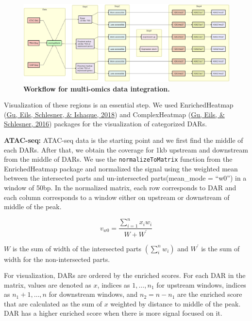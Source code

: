 \documentclass[12pt,twoside]{reedthesis}
\begin{document}
\newpage
\begin{landscape}


\begin{figure}[htbp]

{\centering \includegraphics{thesis_files/figure-latex/mf8-1} 

}

\caption[Workflow for multi-omics data integration]{\textbf{Workflow for multi-omics data integration.}}\label{fig:mf8}
\end{figure}
\end{landscape}
Visualization of these regions is an essential step. We used
EnrichedHeatmap (\protect\hyperlink{ref-gu2018}{Gu, Eils, Schlesner, \& Ishaque, 2018}) and ComplexHeatmap (\protect\hyperlink{ref-gu2016}{Gu, Eils, \& Schlesner, 2016}) packages for the
visualization of categorized DARs.

\textbf{ATAC-seq:} ATAC-seq data is the starting point and we first find the
middle of each DARs. After that, we obtain the coverage for 1kb upstream
and downstream from the middle of DARs. We use the \texttt{normalizeToMatrix}
function from the EnrichedHeatmap package and normalized the signal
using the weighted mean between the intersected parts and un-intersected
parts(mean\_mode = ``w0'') in a window of 50bp. In the normalized matrix,
each row corresponds to DAR and each column corresponds to a window
either on upstream or downstream of middle of the peak.

\[
v_{w 0}=\frac{\sum_{i=1}^{n} x_{i} w_{i}}{W+W^{\prime}}
\]

\({W}\) is the sum of width of the intersected parts
\(\left(\sum_{i}^{n} w_{i}\right)\) and \(W^{\prime}\) is the sum of width
for the non-intersected parts.

For visualization, DARs are ordered by the enriched scores. For each DAR
in the matrix, values are denoted as \({x}\), indices as
\(1, \ldots, n_{1}\) for upstream windows, indices as \(n_{1}+1, \ldots, n\)
for downstream windows, and \(n_{2}=n-n_{1}\) are the enriched score that
are calculated as the sum of \({x}\) weighted by distance to middle of the
peak. DAR has a higher enriched score when there is more signal focused
on it.
\end{document}
